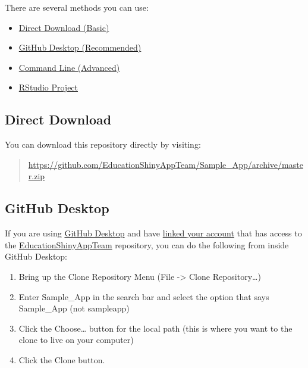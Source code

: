 \documentclass[
]{book}
\providecommand{\tightlist}{%
  \setlength{\itemsep}{0pt}\setlength{\parskip}{0pt}}
\begin{document}
There are several methods you can use:

\begin{itemize}
\tightlist
\item
  \protect\hyperlink{direct-download}{Direct Download (Basic)}
\item
  \protect\hyperlink{github-desktop}{GitHub Desktop (Recommended)}
\item
  \protect\hyperlink{command-line}{Command Line (Advanced)}
\item
  \protect\hyperlink{rstudio-project}{RStudio Project}
\end{itemize}

\hypertarget{direct-download}{%
\subsection{Direct Download}\label{direct-download}}

You can download this repository directly by visiting:

\begin{quote}
\url{https://github.com/EducationShinyAppTeam/Sample_App/archive/master.zip}
\end{quote}

\hypertarget{github-desktop}{%
\subsection{GitHub Desktop}\label{github-desktop}}

If you are using \href{https://desktop.github.com/}{GitHub Desktop} and have \href{https://help.github.com/en/desktop/getting-started-with-github-desktop/authenticating-to-github}{linked your account} that has access to the \href{https://github.com/EducationShinyAppTeam}{EducationShinyAppTeam} repository, you can do the following from inside GitHub Desktop:

\begin{enumerate}
\def\labelenumi{\arabic{enumi}.}
\tightlist
\item
  Bring up the Clone Repository Menu (File -\textgreater{} Clone Repository\ldots)\\
\item
  Enter Sample\_App in the search bar and select the option that says Sample\_App (not sampleapp)
\item
  Click the Choose\ldots{} button for the local path (this is where you want to the clone to live on your computer)
\item
  Click the Clone button.
\end{enumerate}
\end{document}
